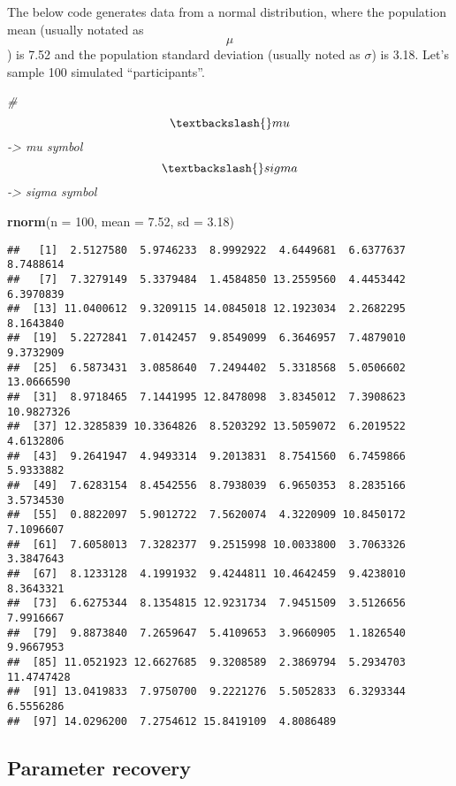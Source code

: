 \documentclass[
]{article}
\newenvironment{Shaded}{\begin{snugshade}}{\end{snugshade}}
\newcommand{\AttributeTok}[1]{\textcolor[rgb]{0.13,0.29,0.53}{#1}}
\newcommand{\CommentTok}[1]{\textcolor[rgb]{0.56,0.35,0.01}{\textit{#1}}}
\newcommand{\DecValTok}[1]{\textcolor[rgb]{0.00,0.00,0.81}{#1}}
\newcommand{\FloatTok}[1]{\textcolor[rgb]{0.00,0.00,0.81}{#1}}
\newcommand{\FunctionTok}[1]{\textcolor[rgb]{0.13,0.29,0.53}{\textbf{#1}}}
\newcommand{\NormalTok}[1]{#1}
\begin{document}
The below code generates data from a normal distribution, where the
population mean (usually notated as \[\mu\] ) is 7.52 and the population
standard deviation (usually noted as \(\sigma\)) is 3.18. Let's sample
100 simulated ``participants''.

\begin{Shaded}
\begin{Highlighting}[]
\CommentTok{\#$$\textbackslash{}mu$$ {-}\textgreater{} mu symbol $$\textbackslash{}sigma$$ {-}\textgreater{} sigma symbol}

\FunctionTok{rnorm}\NormalTok{(}\AttributeTok{n =} \DecValTok{100}\NormalTok{, }
      \AttributeTok{mean =} \FloatTok{7.52}\NormalTok{, }
      \AttributeTok{sd =} \FloatTok{3.18}\NormalTok{)}
\end{Highlighting}
\end{Shaded}

\begin{verbatim}
##   [1]  2.5127580  5.9746233  8.9992922  4.6449681  6.6377637  8.7488614
##   [7]  7.3279149  5.3379484  1.4584850 13.2559560  4.4453442  6.3970839
##  [13] 11.0400612  9.3209115 14.0845018 12.1923034  2.2682295  8.1643840
##  [19]  5.2272841  7.0142457  9.8549099  6.3646957  7.4879010  9.3732909
##  [25]  6.5873431  3.0858640  7.2494402  5.3318568  5.0506602 13.0666590
##  [31]  8.9718465  7.1441995 12.8478098  3.8345012  7.3908623 10.9827326
##  [37] 12.3285839 10.3364826  8.5203292 13.5059072  6.2019522  4.6132806
##  [43]  9.2641947  4.9493314  9.2013831  8.7541560  6.7459866  5.9333882
##  [49]  7.6283154  8.4542556  8.7938039  6.9650353  8.2835166  3.5734530
##  [55]  0.8822097  5.9012722  7.5620074  4.3220909 10.8450172  7.1096607
##  [61]  7.6058013  7.3282377  9.2515998 10.0033800  3.7063326  3.3847643
##  [67]  8.1233128  4.1991932  9.4244811 10.4642459  9.4238010  8.3643321
##  [73]  6.6275344  8.1354815 12.9231734  7.9451509  3.5126656  7.9916667
##  [79]  9.8873840  7.2659647  5.4109653  3.9660905  1.1826540  9.9667953
##  [85] 11.0521923 12.6627685  9.3208589  2.3869794  5.2934703 11.4747428
##  [91] 13.0419833  7.9750700  9.2221276  5.5052833  6.3293344  6.5556286
##  [97] 14.0296200  7.2754612 15.8419109  4.8086489
\end{verbatim}

\hypertarget{parameter-recovery}{%
\subsection{Parameter recovery}\label{parameter-recovery}}
\end{document}
